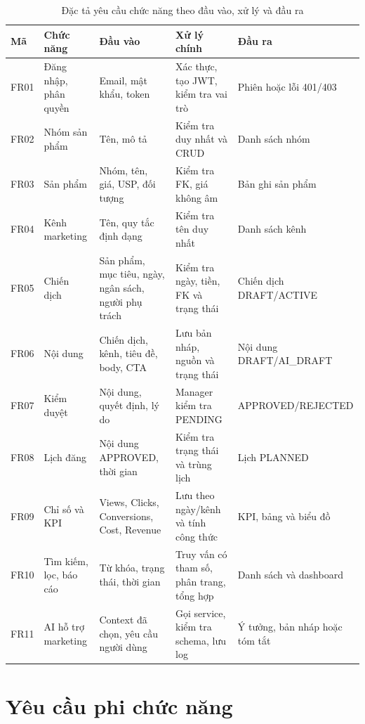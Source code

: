 \begin{table}[h!]
\centering
\scriptsize
\caption{Đặc tả yêu cầu chức năng theo đầu vào, xử lý và đầu ra}
\begin{tabularx}{\textwidth}{|C{0.8cm}|L{2.7cm}|L{3.0cm}|L{3.7cm}|Y|}
\hline
\textbf{Mã} & \textbf{Chức năng} & \textbf{Đầu vào} & \textbf{Xử lý chính} & \textbf{Đầu ra}\\\hline
FR01 & Đăng nhập, phân quyền & Email, mật khẩu, token & Xác thực, tạo JWT, kiểm tra vai trò & Phiên hoặc lỗi 401/403\\\hline
FR02 & Nhóm sản phẩm & Tên, mô tả & Kiểm tra duy nhất và CRUD & Danh sách nhóm\\\hline
FR03 & Sản phẩm & Nhóm, tên, giá, USP, đối tượng & Kiểm tra FK, giá không âm & Bản ghi sản phẩm\\\hline
FR04 & Kênh marketing & Tên, quy tắc định dạng & Kiểm tra tên duy nhất & Danh sách kênh\\\hline
FR05 & Chiến dịch & Sản phẩm, mục tiêu, ngày, ngân sách, người phụ trách & Kiểm tra ngày, tiền, FK và trạng thái & Chiến dịch DRAFT/ACTIVE\\\hline
FR06 & Nội dung & Chiến dịch, kênh, tiêu đề, body, CTA & Lưu bản nháp, nguồn và trạng thái & Nội dung DRAFT/AI\_DRAFT\\\hline
FR07 & Kiểm duyệt & Nội dung, quyết định, lý do & Manager kiểm tra PENDING & APPROVED/REJECTED\\\hline
FR08 & Lịch đăng & Nội dung APPROVED, thời gian & Kiểm tra trạng thái và trùng lịch & Lịch PLANNED\\\hline
FR09 & Chỉ số và KPI & Views, Clicks, Conversions, Cost, Revenue & Lưu theo ngày/kênh và tính công thức & KPI, bảng và biểu đồ\\\hline
FR10 & Tìm kiếm, lọc, báo cáo & Từ khóa, trạng thái, thời gian & Truy vấn có tham số, phân trang, tổng hợp & Danh sách và dashboard\\\hline
FR11 & AI hỗ trợ marketing & Context đã chọn, yêu cầu người dùng & Gọi service, kiểm tra schema, lưu log & Ý tưởng, bản nháp hoặc tóm tắt\\\hline
\end{tabularx}
\end{table}

\section{Yêu cầu phi chức năng}


